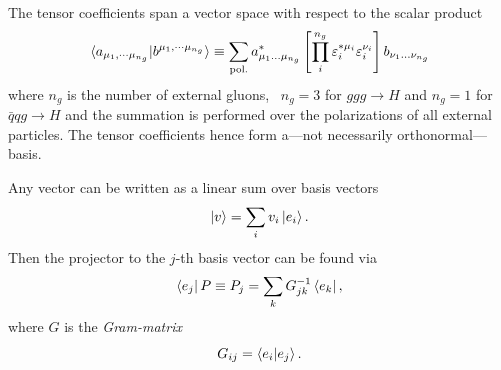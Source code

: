 The tensor coefficients span a vector space with respect to the scalar product
\begin{equation}
\braket{a_{\mu_1, \cdots \mu_{n_g}}| b^{\mu_1, \cdots \mu_{n_g}}} \equiv \sum_{\text{pol.}} a^*_{\mu_1 \ldots \mu_{n_g}} \left[\prod_i^{n_g} \varepsilon_i^{*\mu_i} \varepsilon_i^{\nu_i}  \right]  b_{\nu_1 \ldots \nu_{n_g}}
\label{eq:5:scala_product}
\end{equation}
where $n_g$ is the number of external gluons, \ie\ $n_g = 3$ for $ggg \rightarrow H$ and $n_g = 1$ for $\bar{q} q g \rightarrow H$ and the summation is performed over the polarizations of all external particles. The tensor coefficients hence form a---not necessarily orthonormal---basis.

Any vector can be written as a linear sum over basis vectors
\begin{equation}
\ket{v} = \sum_i v_i \ket{e_i}.
\end{equation}
Then the projector to the $j$-th basis vector can be found via
\begin{equation}
\bra{e_j}P \equiv P_j = \sum_k G^{-1}_{jk} \bra{e_k},
\end{equation}
where $G$ is the \textit{Gram-matrix}
\begin{equation}
G_{ij} = \braket{e_i | e_j}.
\end{equation}


